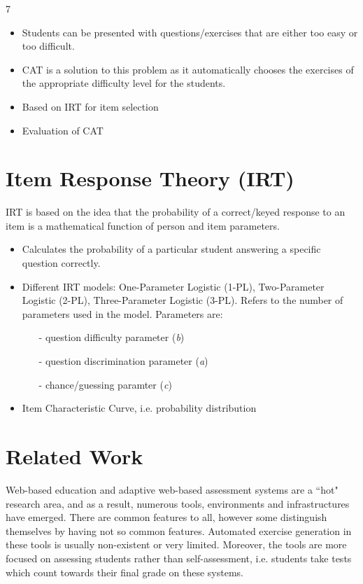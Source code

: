 \documentclass[11pt,a4paper]{report}
\begin{document}
7%
\begin{itemize}
\item Students can be presented with questions/exercises that are either too easy or too difficult.
\item CAT is a solution to this problem as it automatically chooses the exercises of the appropriate difficulty level for the students.
\item Based on IRT for item selection
\item Evaluation of CAT
\end{itemize}

\section{Item Response Theory (IRT)}

IRT is based on the idea that the probability of a correct/keyed response to an item is a mathematical function of person and item parameters. 

\begin{itemize}
\item Calculates the probability of a particular student answering a specific question correctly.
\item Different IRT models: One-Parameter Logistic (1-PL), Two-Parameter Logistic (2-PL), Three-Parameter Logistic (3-PL). Refers to the number of parameters used in the model. Parameters are: 

\begin{itemize}
\item[-] question difficulty parameter (\textit{b})
\item[-] question discrimination parameter (\textit{a})
\item[-] chance/guessing paramter (\textit{c})
\end{itemize}

\item Item Characteristic Curve, i.e. probability distribution

\end{itemize}

\section{Related Work}
Web-based education and adaptive web-based assessment systems are a ``hot" research area, and as a result, numerous tools, environments and infrastructures have emerged. There are common features to all, however some distinguish themselves by having not so common features.
Automated exercise generation in these tools is usually non-existent or very limited. Moreover, the tools are more focused on assessing students rather than self-assessment, i.e. students take tests which count towards their final grade on these systems.
\end{document}
